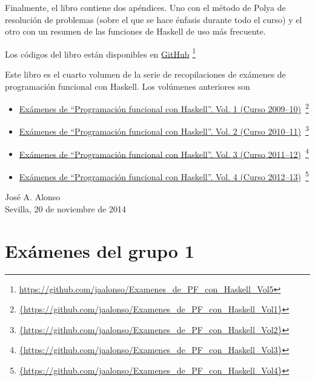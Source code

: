 \documentclass[a4paper,12pt,twoside]{book}
\begin{document}
Finalmente, el libro contiene dos apéndices. Uno con el método de Polya
de resolución de problemas (sobre el que se hace énfasis durante todo el
curso) y el otro con un resumen de las funciones de Haskell de uso más
frecuente.

Los códigos del libro están disponibles en
\href{https://github.com/jaalonso/Examenes_de_PF_con_Haskell_Vol5}
     {GitHub}
     \footnote{{\url{https://github.com/jaalonso/Examenes_de_PF_con_Haskell_Vol5}}}

Este libro es el cuarto volumen de la serie de recopilaciones de
exámenes de programación funcional con Haskell. Los volúmenes anteriores son
\begin{itemize}
\item
  \href{https://github.com/jaalonso/Examenes_de_PF_con_Haskell_Vol1}
  {Exámenes de ``Programaci\'on funcional con Haskell''.
    Vol. 1 (Curso 2009--10)}\
    \footnote{\url{{https://github.com/jaalonso/Examenes_de_PF_con_Haskell_Vol1}}}

\item
  \href{https://github.com/jaalonso/Examenes_de_PF_con_Haskell_Vol2}
  {Exámenes de ``Programaci\'on funcional con Haskell''.
    Vol. 2 (Curso 2010--11)}\
    \footnote{\url{{https://github.com/jaalonso/Examenes_de_PF_con_Haskell_Vol2}}}

\item
  \href{https://github.com/jaalonso/Examenes_de_PF_con_Haskell_Vol3}
  {Exámenes de ``Programaci\'on funcional con Haskell''.
    Vol. 3 (Curso 2011--12)}\
    \footnote{\url{{https://github.com/jaalonso/Examenes_de_PF_con_Haskell_Vol3}}}

\item
  \href{https://github.com/jaalonso/Examenes_de_PF_con_Haskell_Vol4}
  {Exámenes de ``Programaci\'on funcional con Haskell''.
    Vol. 4 (Curso 2012--13)}\
    \footnote{\url{{https://github.com/jaalonso/Examenes_de_PF_con_Haskell_Vol4}}}

\end{itemize}
     
\begin{flushright}
  José A. Alonso \\
  Sevilla, 20 de noviembre de 2014
\end{flushright}

\chapter{Exámenes del grupo 1}
\end{document}
